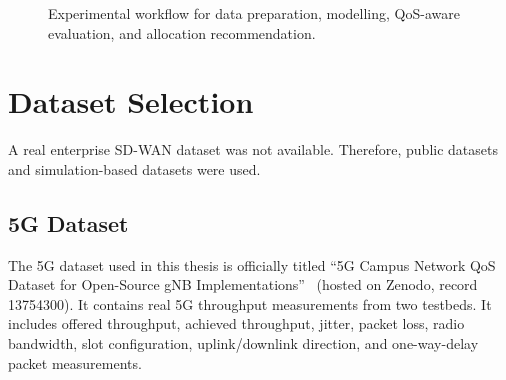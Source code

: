 \documentclass[a4paper,12pt]{Classes/RoboticsLaTeX}
\begin{document}
\begin{figure}[H]
\centering
{}
\caption[End-to-end experimental workflow]{Experimental workflow for data preparation, modelling, QoS-aware evaluation, and allocation recommendation.}
\label{fig:workflow}
\end{figure}

\section{Dataset Selection}

A real enterprise SD-WAN dataset was not available. Therefore, public datasets and simulation-based datasets were used.

\subsection{5G Dataset}

The 5G dataset used in this thesis is officially titled ``5G Campus Network QoS Dataset for Open-Source gNB Implementations''~\cite{raffeck2024zenodo} (hosted on Zenodo, record 13754300). It contains real 5G throughput measurements from two testbeds. It includes offered throughput, achieved throughput, jitter, packet loss, radio bandwidth, slot configuration, uplink/downlink direction, and one-way-delay packet measurements.
\end{document}
